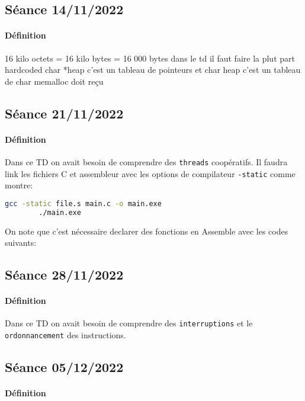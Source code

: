 \documentclass{article}
\begin{document}
\newpage\subsection{Séance 14/11/2022}
\paragraph{Définition}16 kilo octets = 16 kilo bytes = 16 000 bytes
dans le td il faut faire la plut part hardcoded
char *heap c'est un tableau de pointeurs et char heap c'est un tableau de char
memalloc doit reçu

\newpage\subsection{Séance 21/11/2022}
\paragraph{Définition}Dans ce TD on avait besoin de comprendre des \texttt{threads} coopératifs. Il faudra link les fichiers C et assembleur avec les options de compilateur \texttt{-static} comme montre:
\begin{scriptsize}\mycode
    \begin{lstlisting}[language=Bash]
        gcc -static file.s main.c -o main.exe
        ./main.exe
    \end{lstlisting}
\end{scriptsize}
On note que c'est nécessaire declarer des fonctions en Assemble avec les codes suivants:
\begin{scriptsize}\mycode
    
\end{scriptsize}
\begin{scriptsize}\myRISCV
    
\end{scriptsize}

\newpage\subsection{Séance 28/11/2022}
\paragraph{Définition}Dans ce TD on avait besoin de comprendre des \texttt{interruptions} et le \texttt{ordonnancement} des instructions.
\begin{scriptsize}\mycode
    
\end{scriptsize}

\newpage\subsection{Séance 05/12/2022}
\paragraph{Définition}
\begin{scriptsize}\mycode
    
\end{scriptsize}
\end{document}
